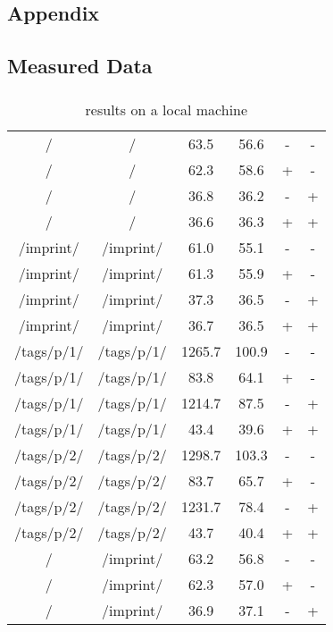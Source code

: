 
\begin{appendix}
\section{Appendix}
\subsection{Measured Data}
\subsubsection{\curl{}}
\begin{center}
\footnotesize
\begin{longtable}{cccccc}
    \caption{\curl{} results on a local machine}
    \\
	\hline
	\thead{From} & \thead{To} & \thead{Common} & \thead{\lare{}} & \thead{DC} & \thead{TC} \\
	\hline
/ & / & 63.5 & 56.6 & - & - \\
/ & / & 62.3 & 58.6 & + & - \\
/ & / & 36.8 & 36.2 & - & + \\
/ & / & 36.6 & 36.3 & + & + \\
\hline
/imprint/ & /imprint/ & 61.0 & 55.1 & - & - \\
/imprint/ & /imprint/ & 61.3 & 55.9 & + & - \\
/imprint/ & /imprint/ & 37.3 & 36.5 & - & + \\
/imprint/ & /imprint/ & 36.7 & 36.5 & + & + \\
\hline
/tags/p/1/ & /tags/p/1/ & 1265.7 & 100.9 & - & - \\
/tags/p/1/ & /tags/p/1/ & 83.8 & 64.1 & + & - \\
/tags/p/1/ & /tags/p/1/ & 1214.7 & 87.5 & - & + \\
/tags/p/1/ & /tags/p/1/ & 43.4 & 39.6 & + & + \\
\hline
/tags/p/2/ & /tags/p/2/ & 1298.7 & 103.3 & - & - \\
/tags/p/2/ & /tags/p/2/ & 83.7 & 65.7 & + & - \\
/tags/p/2/ & /tags/p/2/ & 1231.7 & 78.4 & - & + \\
/tags/p/2/ & /tags/p/2/ & 43.7 & 40.4 & + & + \\
\hline
\hline
/ & /imprint/ & 63.2 & 56.8 & - & - \\
/ & /imprint/ & 62.3 & 57.0 & + & - \\
/ & /imprint/ & 36.9 & 37.1 & - & + \\

\end{longtable}
\end{center}
\end{appendix}
